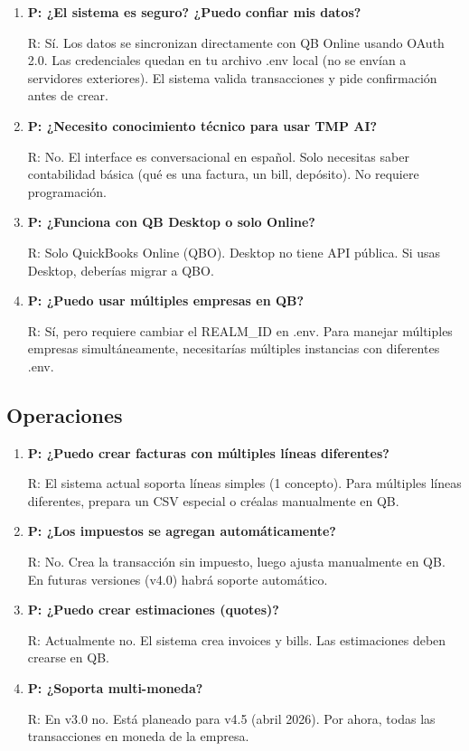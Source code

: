 \documentclass[12pt,oneside]{article}
\begin{document}
\begin{enumerate}
    \item \textbf{P: ¿El sistema es seguro? ¿Puedo confiar mis datos?}
    
    R: Sí. Los datos se sincronizan directamente con QB Online usando OAuth 2.0. Las credenciales quedan en tu archivo .env local (no se envían a servidores exteriores). El sistema valida transacciones y pide confirmación antes de crear.
    
    \item \textbf{P: ¿Necesito conocimiento técnico para usar TMP AI?}
    
    R: No. El interface es conversacional en español. Solo necesitas saber contabilidad básica (qué es una factura, un bill, depósito). No requiere programación.
    
    \item \textbf{P: ¿Funciona con QB Desktop o solo Online?}
    
    R: Solo QuickBooks Online (QBO). Desktop no tiene API pública. Si usas Desktop, deberías migrar a QBO.
    
    \item \textbf{P: ¿Puedo usar múltiples empresas en QB?}
    
    R: Sí, pero requiere cambiar el REALM\_ID en .env. Para manejar múltiples empresas simultáneamente, necesitarías múltiples instancias con diferentes .env.
    
\end{enumerate}

\subsection{Operaciones}

\begin{enumerate}
    \item \textbf{P: ¿Puedo crear facturas con múltiples líneas diferentes?}
    
    R: El sistema actual soporta líneas simples (1 concepto). Para múltiples líneas diferentes, prepara un CSV especial o créalas manualmente en QB.
    
    \item \textbf{P: ¿Los impuestos se agregan automáticamente?}
    
    R: No. Crea la transacción sin impuesto, luego ajusta manualmente en QB. En futuras versiones (v4.0) habrá soporte automático.
    
    \item \textbf{P: ¿Puedo crear estimaciones (quotes)?}
    
    R: Actualmente no. El sistema crea invoices y bills. Las estimaciones deben crearse en QB.
    
    \item \textbf{P: ¿Soporta multi-moneda?}
    
    R: En v3.0 no. Está planeado para v4.5 (abril 2026). Por ahora, todas las transacciones en moneda de la empresa.
    
\end{enumerate}
\end{document}
